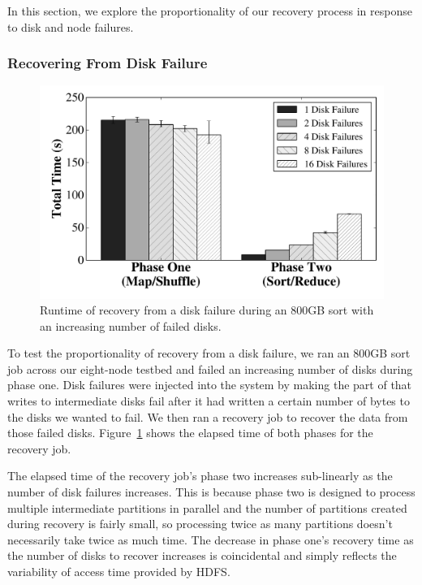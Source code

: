 In this section, we explore the proportionality of our recovery process in
response to disk and node failures.

\subsubsection{Recovering From Disk Failure}
\label{sec:disk_proportionality}

\begin{figure}
  \centering
  \includegraphics[width=\columnwidth]{fault_tolerance/graphs/disk_recovery_proportionality.pdf}
  \caption{\label{fig:disk_recovery_proportionality} Runtime of recovery from a
    disk failure during an 800GB sort with an increasing number of failed
    disks.}
\end{figure}

To test the proportionality of recovery from a disk failure, we ran an 800GB
sort job across our eight-node testbed and failed an increasing number of disks
during phase one. Disk failures were injected into the system by making the
part of \themis that writes to intermediate disks fail after it had written a
certain number of bytes to the disks we wanted to fail. We then ran a recovery
job to recover the data from those failed
disks. Figure~\ref{fig:disk_recovery_proportionality} shows the elapsed time of
both phases for the recovery job.

The elapsed time of the recovery job's phase two increases sub-linearly as the
number of disk failures increases.  This is because phase two is designed to
process multiple intermediate partitions in parallel and the number of
partitions created during recovery is fairly small, so processing twice as many
partitions doesn't necessarily take twice as much time. The decrease in phase
one's recovery time as the number of disks to recover increases is coincidental
and simply reflects the variability of access time provided by HDFS.

